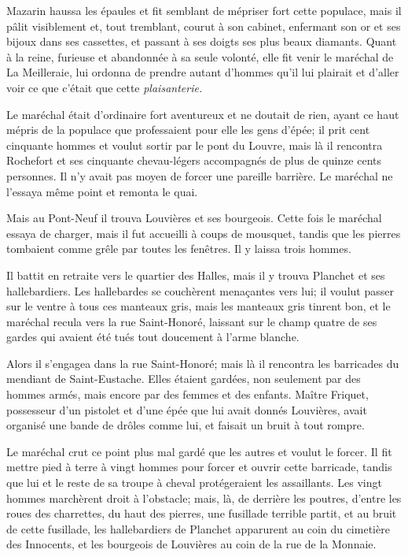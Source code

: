 Mazarin haussa les épaules et fit semblant de mépriser fort cette populace, mais il pâlit visiblement et, tout tremblant, courut à son cabinet, enfermant son or et ses bijoux dans ses cassettes, et passant à ses doigts ses plus beaux diamants. Quant à la reine, furieuse et abandonnée à sa seule volonté, elle fit venir le maréchal de La Meilleraie, lui ordonna de prendre autant d'hommes qu'il lui plairait et d'aller voir ce que c'était que cette \textit{plaisanterie.}

Le maréchal était d'ordinaire fort aventureux et ne doutait de rien, ayant ce haut mépris de la populace que professaient pour elle les gens d'épée; il prit cent cinquante hommes et voulut sortir par le pont du Louvre, mais là il rencontra Rochefort et ses cinquante chevau-légers accompagnés de plus de quinze cents personnes. Il n'y avait pas moyen de forcer une pareille barrière. Le maréchal ne l'essaya même point et remonta le quai.

Mais au Pont-Neuf il trouva Louvières et ses bourgeois. Cette fois le maréchal essaya de charger, mais il fut accueilli à coups de mousquet, tandis que les pierres tombaient comme grêle par toutes les fenêtres. Il y laissa trois hommes.

Il battit en retraite vers le quartier des Halles, mais il y trouva Planchet et ses hallebardiers. Les hallebardes se couchèrent menaçantes vers lui; il voulut passer sur le ventre à tous ces manteaux gris, mais les manteaux gris tinrent bon, et le maréchal recula vers la rue Saint-Honoré, laissant sur le champ quatre de ses gardes qui avaient été tués tout doucement à l'arme blanche.

Alors il s'engagea dans la rue Saint-Honoré; mais là il rencontra les barricades du mendiant de Saint-Eustache. Elles étaient gardées, non seulement par des hommes armés, mais encore par des femmes et des enfants. Maître Friquet, possesseur d'un pistolet et d'une épée que lui avait donnés Louvières, avait organisé une bande de drôles comme lui, et faisait un bruit à tout rompre.

Le maréchal crut ce point plus mal gardé que les autres et voulut le forcer. Il fit mettre pied à terre à vingt hommes pour forcer et ouvrir cette barricade, tandis que lui et le reste de sa troupe à cheval protégeraient les assaillants. Les vingt hommes marchèrent droit à l'obstacle; mais, là, de derrière les poutres, d'entre les roues des charrettes, du haut des pierres, une fusillade terrible partit, et au bruit de cette fusillade, les hallebardiers de Planchet apparurent au coin du cimetière des Innocents, et les bourgeois de Louvières au coin de la rue de la Monnaie.

